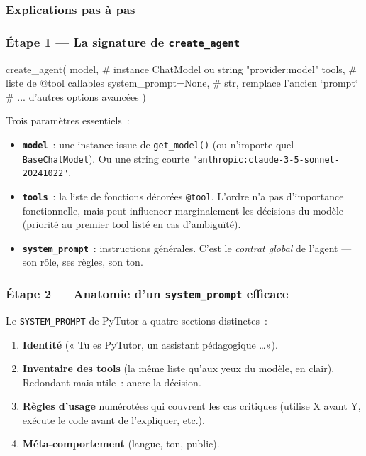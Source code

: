 \documentclass[11pt,a4paper]{article}
\begin{document}
\subsubsection{Explications pas à pas}

\subsubsection*{Étape 1 — La signature de \texttt{create\_agent}}

\begin{pythoncode}
create_agent(
    model,                # instance ChatModel ou string "provider:model"
    tools,                # liste de @tool callables
    system_prompt=None,   # str, remplace l'ancien `prompt`
    # ... d'autres options avancées
)
\end{pythoncode}

Trois paramètres essentiels~:

\begin{itemize}[leftmargin=*]
  \item \textbf{\texttt{model}}~: une instance issue de \texttt{get\_model()}
        (ou n'importe quel \texttt{BaseChatModel}). Ou une string courte
        \texttt{"anthropic:claude-3-5-sonnet-20241022"}.
  \item \textbf{\texttt{tools}}~: la liste de fonctions décorées
        \texttt{@tool}. L'ordre n'a pas d'importance fonctionnelle,
        mais peut influencer marginalement les décisions du modèle
        (priorité au premier tool listé en cas d'ambiguïté).
  \item \textbf{\texttt{system\_prompt}}~: instructions générales. C'est
        le \emph{contrat global} de l'agent — son rôle, ses règles, son
        ton.
\end{itemize}

\subsubsection*{Étape 2 — Anatomie d'un \texttt{system\_prompt} efficace}

Le \texttt{SYSTEM\_PROMPT} de PyTutor a quatre sections distinctes~:

\begin{enumerate}[leftmargin=*]
  \item \textbf{Identité} (« Tu es PyTutor, un assistant pédagogique
        \dots »).
  \item \textbf{Inventaire des tools} (la même liste qu'aux yeux du
        modèle, en clair). Redondant mais utile~: ancre la décision.
  \item \textbf{Règles d'usage} numérotées qui couvrent les cas
        critiques (utilise X avant Y, exécute le code avant de
        l'expliquer, etc.).
  \item \textbf{Méta-comportement} (langue, ton, public).
\end{enumerate}
\end{document}
